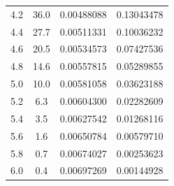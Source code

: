 \documentclass[12pt,a4paper,UTF8]{ctexart}
\begin{document}
\begin{table}[htbp]
\begin{longtable}{cccc}
	4.2&36.0&0.00488088&0.13043478 \\
	4.4&27.7&0.00511331&0.10036232 \\
	4.6&20.5&0.00534573&0.07427536 \\
	4.8&14.6&0.00557815&0.05289855 \\
	5.0&10.0&0.00581058&0.03623188 \\
	5.2&6.3&0.00604300&0.02282609 \\
	5.4&3.5&0.00627542&0.01268116 \\
	5.6&1.6&0.00650784&0.00579710 \\
	5.8&0.7&0.00674027&0.00253623 \\
	6.0&0.4&0.00697269&0.00144928 \\
	\bottomrule
\end{longtable}%
\label{tab:data1}%
\end{table}%
\end{document}
